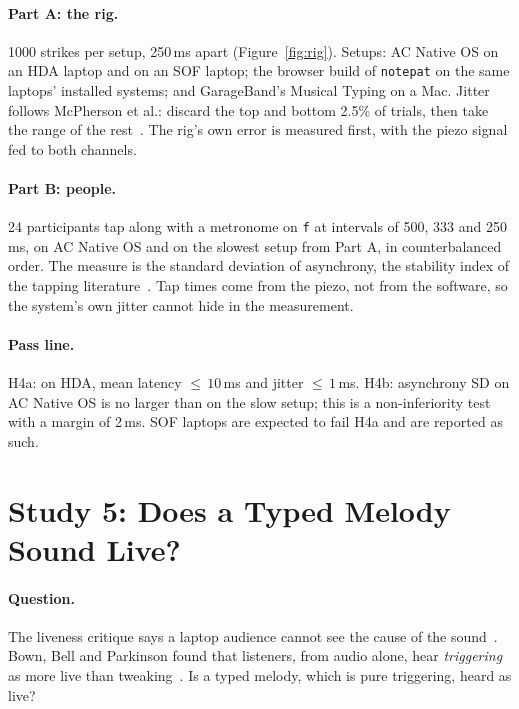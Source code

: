 \documentclass[10pt,letterpaper,twocolumn]{article}
\newcommand{\acos}{AC Native OS}
\newcommand{\np}{\texttt{notepat}}
\newcommand{\key}[1]{\texttt{#1}}
\begin{document}
\paragraph{Part A: the rig.} 1000 strikes per setup, 250\,ms apart (Figure~\ref{fig:rig}). Setups: \acos{} on an HDA laptop and on an SOF laptop; the browser build of \np{} on the same laptops' installed systems; and GarageBand's Musical Typing on a Mac. Jitter follows McPherson et al.: discard the top and bottom 2.5\% of trials, then take the range of the rest~\citep{mcpherson2016latency}. The rig's own error is measured first, with the piezo signal fed to both channels.

\paragraph{Part B: people.} 24 participants tap along with a metronome on \key{f} at intervals of 500, 333 and 250\,ms, on \acos{} and on the slowest setup from Part A, in counterbalanced order. The measure is the standard deviation of asynchrony, the stability index of the tapping literature~\citep{repp2005sms}. Tap times come from the piezo, not from the software, so the system's own jitter cannot hide in the measurement.

\paragraph{Pass line.} H4a: on HDA, mean latency ${\le}\,10$\,ms and jitter ${\le}\,1$\,ms. H4b: asynchrony SD on \acos{} is no larger than on the slow setup; this is a non-inferiority test with a margin of 2\,ms. SOF laptops are expected to fail H4a and are reported as such.

\section{Study 5: Does a Typed Melody Sound Live?}
\label{sec:s5}

\paragraph{Question.} The liveness critique says a laptop audience cannot see the cause of the sound~\citep{cascone2003grain,collins2003generative}. Bown, Bell and Parkinson found that listeners, from audio alone, hear \emph{triggering} as more live than tweaking~\citep{bown2014liveness}. Is a typed melody, which is pure triggering, heard as live?
\end{document}

